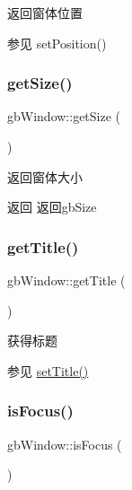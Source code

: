返回窗体位置 

\begin{DoxySeeAlso}{参见}
set\+Position() 
\end{DoxySeeAlso}
\mbox{\label{classgb_window_af329e62282ec4ed7184eb8c58d7f7809}} 
\subsubsection{\texorpdfstring{getSize()}{getSize()}}
{\footnotesize\ttfamily gb\+Window\+::get\+Size (\begin{DoxyParamCaption}{ }\end{DoxyParamCaption})}



返回窗体大小 

\begin{DoxyReturn}{返回}
返回gb\+Size 
\end{DoxyReturn}
\mbox{\label{classgb_window_a42dac83ea2862f0e5277eaf1df4bf740}} 
\subsubsection{\texorpdfstring{getTitle()}{getTitle()}}
{\footnotesize\ttfamily gb\+Window\+::get\+Title (\begin{DoxyParamCaption}{ }\end{DoxyParamCaption})}



获得标题 

\begin{DoxySeeAlso}{参见}
\mbox{\hyperlink{classgb_window_a17f154d7c86e29d7337fe46cc183c5dc}{set\+Title()}} 
\end{DoxySeeAlso}
\mbox{\label{classgb_window_a2e2392232e1ddb4ee301dc8069ab6230}} 
\subsubsection{\texorpdfstring{isFocus()}{isFocus()}}
{\footnotesize\ttfamily gb\+Window\+::is\+Focus (\begin{DoxyParamCaption}{ }\end{DoxyParamCaption})}



